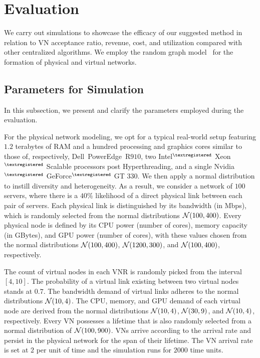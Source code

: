 \section{Evaluation}




We carry out simulations to showcase the efficacy of our suggested method in relation to VN acceptance ratio, revenue, cost, and utilization compared with other centralized algorithms. We employ the random graph model~\cite{randomGraph} for the formation of physical and virtual networks. 




\subsection{Parameters for Simulation}
In this subsection, we present and clarify the parameters employed during the evaluation.

 For the physical network modeling, we opt for a typical real-world setup featuring $1.2$ terabytes of RAM and a hundred processing and graphics cores similar to those of, respectively, Dell\texttrademark\ PowerEdge\texttrademark\ R$910$, two Intel$^{\tiny{\textregistered}}$ Xeon$^{\tiny{\textregistered}}$ Scalable processors post Hyperthreading, and a single Nvidia$^{\tiny{\textregistered}}$ GeForce$^{\tiny{\textregistered}}$ GT $330$. We then apply a normal distribution to instill diversity and heterogeneity. As a result, we consider a network of $100$ servers, where there is a $40\%$ likelihood of a direct physical link between each pair of servers. Each physical link is distinguished by its bandwidth (in Mbps), which is randomly selected from the normal distributions $\mathcal{N}(100, 400)$. Every physical node is defined by its CPU power (number of cores), memory capacity (in GBytes), and GPU power (number of cores), with these values chosen from the normal distributions $\mathcal{N}(100, 400)$, $\mathcal{N}(1200, 300)$, and $\mathcal{N}(100, 400)$, respectively.

 The count of virtual nodes in each VNR is randomly picked from the interval $[4, 10]$. The probability of a virtual link existing between two virtual nodes stands at $0.7$. The bandwidth demand of virtual links adheres to the normal distributions $\mathcal{N}(10, 4)$. The CPU, memory, and GPU demand of each virtual node are derived from the normal distributions $\mathcal{N}(10, 4)$, $\mathcal{N}(30, 9)$, and $\mathcal{N}(10, 4)$, respectively. Every VN possesses a lifetime that is also randomly selected from a normal distribution of $\mathcal{N}(100, 900)$. VNs arrive according to the arrival rate and persist in the physical network for the span of their lifetime. The VN arrival rate is set at $2$ per unit of time and the simulation runs for $2000$ time units.

